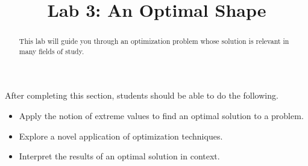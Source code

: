 \documentclass{ximera}
\title{Lab 3: An Optimal Shape}
\begin{document}
\begin{abstract}
This lab will guide you through an optimization problem whose solution is relevant in many fields of study.
\end{abstract}

\maketitle

\begin{sectionOutcomes}

After completing this section, students should be able to do the following.

\begin{itemize}
\item Apply the notion of extreme values to find an optimal solution to a problem.
\item Explore a novel application of optimization techniques.
\item Interpret the results of an optimal solution in context.
\end{itemize}

\end{sectionOutcomes}
\end{document}
